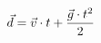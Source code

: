\documentclass[preview]{standalone}
\begin{document}
\begin{align*}
\special{dvisvgm:raw <g id='unique000'>}\vec{d}=\vec{v}\cdot t+\frac{\vec{g}\cdot t^2}{2}\special{dvisvgm:raw </g>}
\end{align*}
\end{document}
